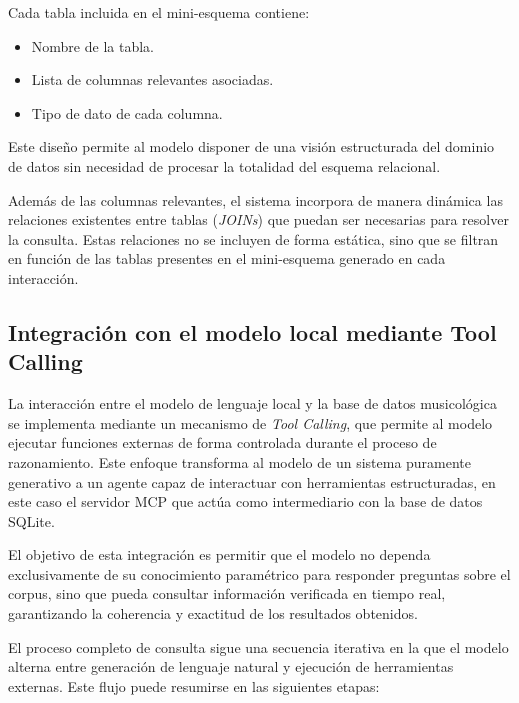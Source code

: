 Cada tabla incluida en el mini-esquema contiene:

\begin{itemize}
\item Nombre de la tabla.
\item Lista de columnas relevantes asociadas.
\item Tipo de dato de cada columna.
\end{itemize}

Este diseño permite al modelo disponer de una visión estructurada del dominio de datos sin necesidad de procesar la totalidad del esquema relacional.

Además de las columnas relevantes, el sistema incorpora de manera dinámica las relaciones existentes entre tablas (\textit{JOINs}) que puedan ser necesarias para resolver la consulta. Estas relaciones no se incluyen de forma estática, sino que se filtran en función de las tablas presentes en el mini-esquema generado en cada interacción.

\subsection{Integración con el modelo local mediante Tool Calling}
La interacción entre el modelo de lenguaje local y la base de datos musicológica se implementa mediante un mecanismo de \textit{Tool Calling}, que permite al modelo ejecutar funciones externas de forma controlada durante el proceso de razonamiento. Este enfoque transforma al modelo de un sistema puramente generativo a un agente capaz de interactuar con herramientas estructuradas, en este caso el servidor MCP que actúa como intermediario con la base de datos SQLite.

El objetivo de esta integración es permitir que el modelo no dependa exclusivamente de su conocimiento paramétrico para responder preguntas sobre el corpus, sino que pueda consultar información verificada en tiempo real, garantizando la coherencia y exactitud de los resultados obtenidos.

El proceso completo de consulta sigue una secuencia iterativa en la que el modelo alterna entre generación de lenguaje natural y ejecución de herramientas externas. Este flujo puede resumirse en las siguientes etapas:

